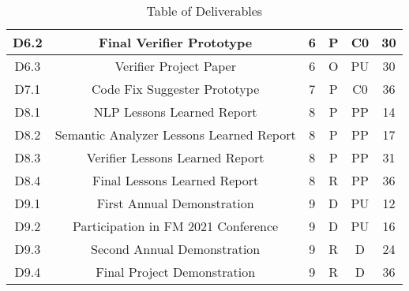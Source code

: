 \begin{table}[hbpt]
\begin{adjustbox}{width=1\textwidth}
\begin{tabular}{ |c|c|c|c|c|c|}
			D6.2 & Final Verifier Prototype & 6 & P & C0 & 30\\
			\hline
			
			D6.3 & Verifier Project Paper & 6 & O & PU & 30\\
			\hline
			
			D7.1 & Code Fix Suggester Prototype & 7 & P & C0 & 36\\
			\hline
			
			D8.1 & NLP Lessons Learned Report & 8 & P & PP & 14\\
			\hline
			
			D8.2 & Semantic Analyzer Lessons Learned Report & 8 & P & PP & 17\\
			\hline
			
			D8.3 & Verifier Lessons Learned Report & 8 & P & PP & 31\\
			\hline
			
			D8.4 & Final Lessons Learned Report & 8 & R & PP & 36\\
			\hline
			
			D9.1 & First Annual Demonstration & 9 & D & PU & 12\\
			\hline
			
			D9.2 & Participation in FM 2021 Conference & 9 & D & PU & 16\\
			\hline
			
			D9.3 & Second Annual Demonstration & 9 & R & D & 24\\
			\hline
			
			D9.4 & Final Project Demonstration & 9 & R & D & 36\\
			\hline
			
		\end{tabular}
	\end{adjustbox}
\caption{Table of Deliverables}
\end{table}